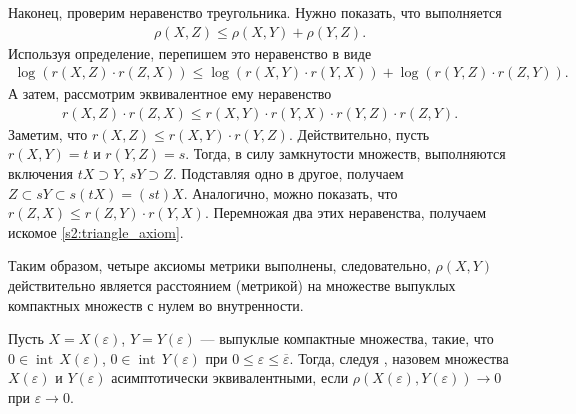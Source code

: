 \documentclass[../main.tex]{subfiles}
\begin{document}
Наконец, проверим неравенство треугольника. 
Нужно показать, что выполняется
\begin{gather*}
	\rho(X,Z) \leqslant \rho(X,Y) + \rho(Y,Z).
\end{gather*}
Используя определение, перепишем это неравенство в виде
\begin{gather*}
	\log(r(X,Z) \cdot r(Z,X)) \leqslant \log(r(X,Y) \cdot r(Y,X)) + \log(r(Y,Z) \cdot r(Z,Y)).
\end{gather*}
А затем, рассмотрим эквивалентное ему неравенство
\begin{gather}\label{s2:triangle_axiom}
	r(X,Z) \cdot r(Z,X) \leqslant r(X,Y) \cdot r(Y,X) \cdot r(Y,Z) \cdot r(Z,Y).
\end{gather}
Заметим, что $r(X,Z) \leqslant r(X,Y) \cdot r(Y,Z)$.
Действительно, пусть $ r(X,Y) = t $ и $r(Y,Z) = s$.
Тогда, в силу замкнутости множеств, выполняются включения $tX \supset Y$, $sY \supset Z$.
Подставляя одно в другое, получаем $Z \subset sY \subset s(tX) = (st) X$.
Аналогично, можно показать, что $r(Z,X) \leqslant r(Z,Y) \cdot r(Y,X)$. 
Перемножая два этих неравенства, получаем искомое \eqref{s2:triangle_axiom}.

Таким образом, четыре аксиомы метрики выполнены, следовательно, $\rho(X,Y)$ действительно является расстоянием (метрикой) на множестве выпуклых компактных множеств с нулем во внутренности.


Пусть $ X = X(\varepsilon) $, $ Y = Y(\varepsilon) $ --- выпуклые компактные множества, такие, что $ 0 \in \operatorname{int}\,X(\varepsilon) $, $ 0 \in \operatorname{int}\,Y(\varepsilon) $ при $0 \leqslant \varepsilon \leqslant \overline{\varepsilon} $.
Тогда, следуя \cite{Ovs}, назовем множества $ X(\varepsilon) $ и $ Y(\varepsilon) $ асимптотически эквивалентными, если $ \rho (X(\varepsilon), Y(\varepsilon)) \rightarrow 0 $ при $\varepsilon \rightarrow 0 $.
\end{document}
